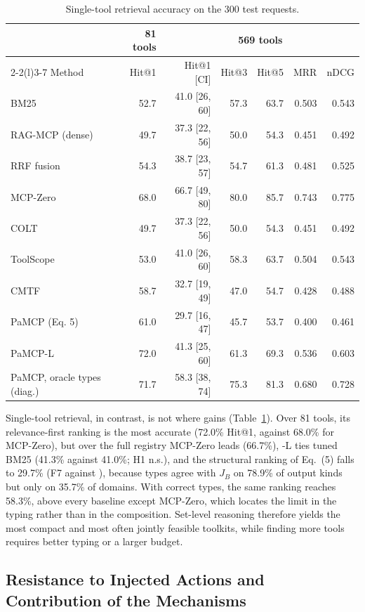 \begin{table}[t]
\centering
\caption{Single-tool retrieval accuracy on the 300 test requests.}
\label{tab:ev-retrieval}
\scriptsize
\setlength{\tabcolsep}{2.4pt}
\begin{tabular}{@{}lrrrrrr@{}}
\toprule
 & 81 tools & \multicolumn{5}{c}{569 tools} \\
\cmidrule(lr){2-2}\cmidrule(l){3-7}
Method & Hit@1 & Hit@1 [CI] & Hit@3 & Hit@5 & MRR & nDCG \\
\midrule
BM25 & 52.7 & 41.0 [26, 60] & 57.3 & 63.7 & 0.503 & 0.543 \\
RAG-MCP (dense) & 49.7 & 37.3 [22, 56] & 50.0 & 54.3 & 0.451 & 0.492 \\
RRF fusion & 54.3 & 38.7 [23, 57] & 54.7 & 61.3 & 0.481 & 0.525 \\
MCP-Zero & 68.0 & 66.7 [49, 80] & 80.0 & 85.7 & 0.743 & 0.775 \\
COLT & 49.7 & 37.3 [22, 56] & 50.0 & 54.3 & 0.451 & 0.492 \\
ToolScope & 53.0 & 41.0 [26, 60] & 58.3 & 63.7 & 0.504 & 0.543 \\
CMTF & 58.7 & 32.7 [19, 49] & 47.0 & 54.7 & 0.428 & 0.488 \\
PaMCP (Eq. 5) & 61.0 & 29.7 [16, 47] & 45.7 & 53.7 & 0.400 & 0.461 \\
PaMCP-L & 72.0 & 41.3 [25, 60] & 61.3 & 69.3 & 0.536 & 0.603 \\
PaMCP, oracle types (diag.) & 71.7 & 58.3 [38, 74] & 75.3 & 81.3 & 0.680 & 0.728 \\
\bottomrule
\end{tabular}
\end{table}

Single-tool retrieval, in contrast, is not where \pamcp{} gains (Table~\ref{tab:ev-retrieval}). Over 81 tools, its
relevance-first ranking is the most accurate (72.0\% Hit@1, against 68.0\% for MCP-Zero), but over the full
registry MCP-Zero leads (66.7\%), \pamcp{}-L ties tuned BM25 (41.3\% against 41.0\%; H1 n.s.), and the structural
ranking of Eq.~(5) falls to 29.7\% (F7 against \pamcp{}), because types agree with $J_B$ on 78.9\% of output kinds
but only on 35.7\% of domains. With correct types, the same ranking reaches 58.3\%, above every baseline except
MCP-Zero, which locates the limit in the typing rather than in the composition. Set-level reasoning therefore
yields the most compact and most often jointly feasible toolkits, while finding more tools requires better typing
or a larger budget.

\subsection{Resistance to Injected Actions and Contribution of the Mechanisms}
\label{sec:ev-sec}

